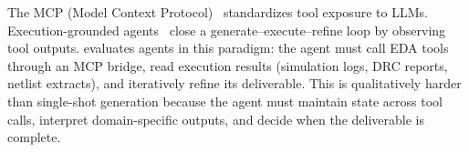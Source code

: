 The MCP (Model Context Protocol)~\cite{lee2025autoeda} standardizes tool exposure to LLMs. Execution-grounded agents~\cite{zhu2026edascript, schick2024toolformer} close a generate--execute--refine loop by observing tool outputs. \bench{} evaluates agents in this paradigm: the agent must call EDA tools through an MCP bridge, read execution results (simulation logs, DRC reports, netlist extracts), and iteratively refine its deliverable. This is qualitatively harder than single-shot generation because the agent must maintain state across tool calls, interpret domain-specific outputs, and decide when the deliverable is complete.
